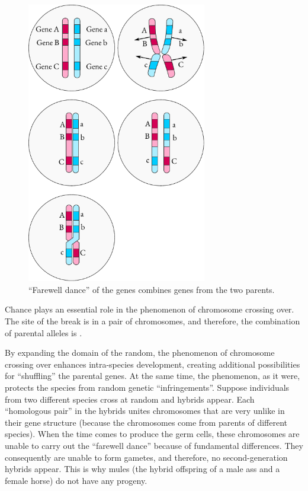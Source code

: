 \begin{figure}[!ht]
\centering
\includegraphics[width=0.7\textwidth]{figures/genes3.pdf}
\caption{``Farewell dance'' of the genes combines genes from the two parents.
\label{genes3}}
\end{figure}


Chance plays an essential role in the phenomenon of chromosome
crossing over. The site of the break is  in a pair of chromosomes, and therefore, the combination of parental alleles is  .

By expanding the domain of the random, the phenomenon of
chromosome crossing over enhances intra-species development, creating
additional possibilities for ``shuffling'' the parental genes. At the same
time, the phenomenon, as it were, protects the species from random
genetic ``infringements''. Suppose individuals from two different species
cross at random and hybrids appear. Each ``homologous pair'' in the
hybrids unites chromosomes that are very unlike in their gene structure
(because the chromosomes come from parents of different species). When
the time comes to produce the germ cells, these chromosomes are
unable to carry out the ``farewell dance'' because of fundamental
differences. They consequently are unable to form gametes, and therefore,
no second-generation hybrids appear. This is why mules (the
hybrid offspring of a male ass and a female horse) do not have any
progeny.

